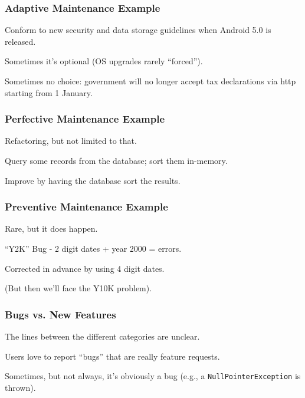 \begin{frame}
\frametitle{Adaptive Maintenance Example}
\begin{changemargin}{1cm}

Conform to new security and data storage guidelines when Android 5.0 is released.

Sometimes it's optional (OS upgrades rarely ``forced'').

Sometimes no choice: government will no longer accept tax declarations via http starting from 1 January.

\end{changemargin}
\end{frame}

\begin{frame}
\frametitle{Perfective Maintenance Example}
\begin{changemargin}{1cm}
Refactoring, but not limited to that.

Query some records from the database; sort them in-memory.

Improve by having the database sort the results.


\end{changemargin}
\end{frame}

\begin{frame}
\frametitle{Preventive Maintenance Example}
\begin{changemargin}{1cm}

Rare, but it does happen.

``Y2K'' Bug - 2 digit dates + year 2000 = errors.

Corrected in advance by using 4 digit dates.

(But then we'll face the Y10K problem).

\end{changemargin}
\end{frame}

\begin{frame}
\frametitle{Bugs vs. New Features}
\begin{changemargin}{1cm}

The lines between the different categories are unclear.

Users love to report ``bugs'' that are really feature requests.

Sometimes, but not always, it's obviously a bug (e.g., a \texttt{NullPointerException} is thrown). 

\end{changemargin}
\end{frame}

